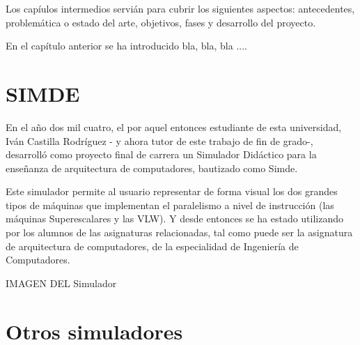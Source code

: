 

Los capíulos intermedios servián para cubrir los siguientes aspectos:
antecedentes, problemática o estado del arte, objetivos, fases y 
desarrollo del proyecto.

En el capítulo anterior se ha introducido bla, bla, bla ....


\section{SIMDE}
\label{2:sec1}

En el año dos mil cuatro, el por aquel entonces estudiante de esta universidad, 
Iván Castilla Rodríguez - y ahora tutor de este trabajo de fin de grado-, 
desarrolló como proyecto final de carrera un Simulador Didáctico para la enseñanza 
de arquitectura de computadores, bautizado como Simde. 

\bigskip
Este simulador permite al usuario representar de forma visual los dos grandes tipos 
de máquinas que implementan el paralelismo a nivel de instrucción (las máquinas 
Superescalares y las VLW). Y desde entonces se ha estado utilizando por los alumnos 
de las asignaturas relacionadas, tal como puede ser la asignatura de arquitectura de 
computadores, de la especialidad de Ingeniería de Computadores.

IMAGEN DEL Simulador

\section{Otros simuladores}
\label{2:sec2}


